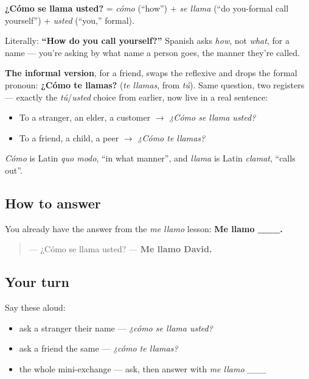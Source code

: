 \begin{cousinweb}
\textbf{¿Cómo se llama usted?} = \emph{cómo} (\textquotedblleft{}how\textquotedblright{}) + \emph{se llama} (\textquotedblleft{}do you-formal call yourself\textquotedblright{}) + \emph{usted} (\textquotedblleft{}you,\textquotedblright{} formal).

Literally: \textbf{\textquotedblleft{}How do you call yourself?\textquotedblright{}} Spanish asks \emph{how}, not \emph{what}, for a name — you're asking by what name a person goes, the manner they're called.

\textbf{The informal version}, for a friend, swaps the reflexive and drops the formal pronoun: \textbf{¿Cómo te llamas?} (\emph{te llamas}, from \emph{tú}). Same question, two registers — exactly the \emph{tú}/\emph{usted} choice from earlier, now live in a real sentence:

\begin{itemize}
\raggedright
  \item To a stranger, an elder, a customer $\to$ \emph{¿Cómo se llama usted?}
  \item To a friend, a child, a peer $\to$ \emph{¿Cómo te llamas?}
\end{itemize}

\emph{Cómo} is Latin \emph{quo modo}, \textquotedblleft{}in what manner\textquotedblright{}, and \emph{llama} is Latin \emph{clamat}, \textquotedblleft{}calls out\textquotedblright{}.
\end{cousinweb}

\subsection*{How to answer}
You already have the answer from the \emph{me llamo} lesson: \textbf{Me llamo \_\_\_.}

\begin{quote}
— ¿Cómo se llama usted? — \textbf{Me llamo David.}
\end{quote}

\subsection*{Your turn}
Say these aloud:

\begin{itemize}
\raggedright
  \item ask a stranger their name — \emph{¿cómo se llama usted?}
  \item ask a friend the same — \emph{¿cómo te llamas?}
  \item the whole mini-exchange — ask, then answer with \emph{me llamo \_\_\_}
\end{itemize}

